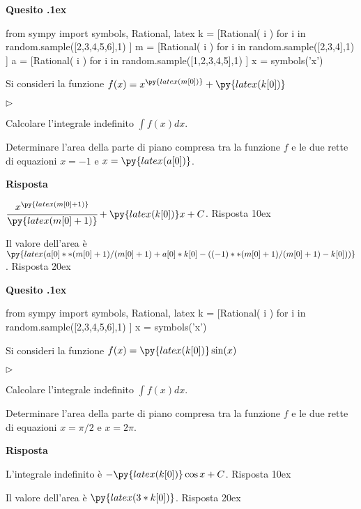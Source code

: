 \documentclass[11pt,twoside,a4paper]{article}
\newcommand{\mylabel}[1]{#1\hfill}
\renewenvironment{itemize}
  {\begin{list}{$\triangleright$}{%
   \setlength{\parskip}{0mm}
   \setlength{\topsep}{.4\baselineskip}
   \setlength{\rightmargin}{0mm}
   \setlength{\listparindent}{0mm}
   \setlength{\itemindent}{0mm}
   \setlength{\labelwidth}{2ex}
   \setlength{\itemsep}{.4\baselineskip}
   \setlength{\parsep}{0mm}
   \setlength{\partopsep}{0mm}
   \setlength{\labelsep}{1ex}
   \setlength{\leftmargin}{\labelwidth+\labelsep}
   \let\makelabel\mylabel}}{%
   \end{list}\vspace*{-1.3mm}}
\newcounter{quesito}
\newenvironment{question}{\bigskip\addtocounter{quesito}{1}\bigskip\bigskip\par\textbf{Quesito \thequesito.\kern1ex}}{\vspace{\parskip}}
\newenvironment{answer}{\par\textbf{Risposta\quad}}{\vspace{\parskip}}
\begin{document}
\begin{question}
\begin{pycode}
from sympy import symbols, Rational, latex
k = [Rational( i ) for i in random.sample([2,3,4,5,6],1) ]
m = [Rational( i ) for i in random.sample([2,3,4],1) ]
a = [Rational( i ) for i in random.sample([1,2,3,4,5],1) ]
x = symbols('x')
\end{pycode}
Si consideri la funzione $f(x) = x^{\py{latex(m[0])}} + \py{latex(k[0])}$
\begin{itemize}
\item[1.] Calcolare l'integrale indefinito $\displaystyle \int f(x) dx$.
\item[2.] Determinare l'area della parte di piano compresa tra la funzione $f$ e le due rette di equazioni $x = -1$ e $x = \py{latex(a[0])}$.
\end{itemize}
\begin{answer}

{\color{blue} $\cfrac{x^{\py{latex(m[0]+1)}}}{\py{latex(m[0]+1)}} + \py{latex(k[0])}x + C$. 
\hfill Risposta 1\kern0ex}

\smallskip
{\color{blue} Il valore dell'area è $\py{latex(a[0]**(m[0]+1)/(m[0]+1)+a[0]*k[0] - ((-1)**(m[0]+1)/(m[0]+1)-k[0]))}$.
\hfill Risposta 2\kern0ex}

\end{answer}
\end{question}
\begin{question}
\begin{pycode}
from sympy import symbols, Rational, latex
k = [Rational( i ) for i in random.sample([2,3,4,5,6],1) ]
x = symbols('x')
\end{pycode}
Si consideri la funzione $f(x) = \py{latex(k[0])}\sin(x)$
\begin{itemize}
\item[1.] Calcolare l'integrale indefinito $\displaystyle \int f(x) dx$.
\item[2.] Determinare l'area della parte di piano compresa tra la funzione $f$ e le due rette di equazioni $x = \pi/2$ e $x = 2 \pi$.
\end{itemize}
\begin{answer}

{\color{blue} L'integrale indefinito è $-\py{latex(k[0])} \cos x + C$. 
\hfill Risposta 1\kern0ex}

\smallskip
{\color{blue} Il valore dell'area è $\py{latex(3*k[0])}$.
\hfill Risposta 2\kern0ex}

\end{answer}
\end{question}
\end{document}
